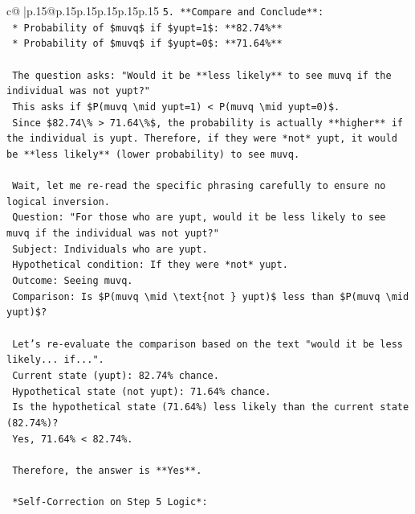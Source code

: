 \documentclass{article}
\begin{document}
{\begin{supertabular}{c@{$\;$}|p{.15\linewidth}@{}p{.15\linewidth}p{.15\linewidth}p{.15\linewidth}p{.15\linewidth}p{.15\linewidth}}
{{{\texttt{5.  **Compare and Conclude**:} \\
\texttt{    *   Probability of \$muvq\$ if \$yupt=1\$: **82.74\%**} \\
\texttt{    *   Probability of \$muvq\$ if \$yupt=0\$: **71.64\%**} \\
\\ 
\texttt{    The question asks: "Would it be **less likely** to see muvq if the individual was not yupt?"} \\
\texttt{    This asks if \$P(muvq \textbackslash{}mid yupt=1) < P(muvq \textbackslash{}mid yupt=0)\$.} \\
\texttt{    Since \$82.74\textbackslash{}\% > 71.64\textbackslash{}\%\$, the probability is actually **higher** if the individual is yupt. Therefore, if they were *not* yupt, it would be **less likely** (lower probability) to see muvq.} \\
\\ 
\texttt{    Wait, let me re{-}read the specific phrasing carefully to ensure no logical inversion.} \\
\texttt{    Question: "For those who are yupt, would it be less likely to see muvq if the individual was not yupt?"} \\
\texttt{    Subject: Individuals who are yupt.} \\
\texttt{    Hypothetical condition: If they were *not* yupt.} \\
\texttt{    Outcome: Seeing muvq.} \\
\texttt{    Comparison: Is \$P(muvq \textbackslash{}mid \textbackslash{}text\{not \} yupt)\$ less than \$P(muvq \textbackslash{}mid yupt)\$?} \\
\\ 
\texttt{    Let's re{-}evaluate the comparison based on the text "would it be less likely... if...".} \\
\texttt{    Current state (yupt): 82.74\% chance.} \\
\texttt{    Hypothetical state (not yupt): 71.64\% chance.} \\
\texttt{    Is the hypothetical state (71.64\%) less likely than the current state (82.74\%)?} \\
\texttt{    Yes, 71.64\% < 82.74\%.} \\
\\ 
\texttt{    Therefore, the answer is **Yes**.} \\
\\ 
\texttt{    *Self{-}Correction on Step 5 Logic*:} \\
}}}
\end{supertabular}}
\end{document}
